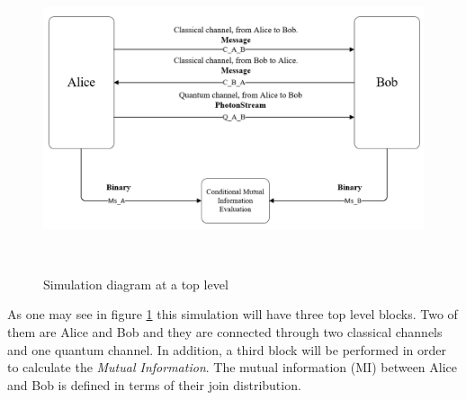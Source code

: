 \begin{figure}[h]
	\centering
	\includegraphics[width=1.0\textwidth, height=9cm]{./sdf/qokd_with_discrete_variables/figures/Simulation_diagram_top.png}
	\caption{Simulation diagram at a top level}\label{toplevelsimulation}
\end{figure}

As one may see in figure \ref{toplevelsimulation} this simulation will have three top level blocks. Two of them are Alice and Bob and they are connected through two classical channels and one quantum channel. In addition, a third block will be performed in order to calculate the \textit{Mutual Information}. The mutual information (MI) between Alice and Bob is defined in terms of their join distribution.


